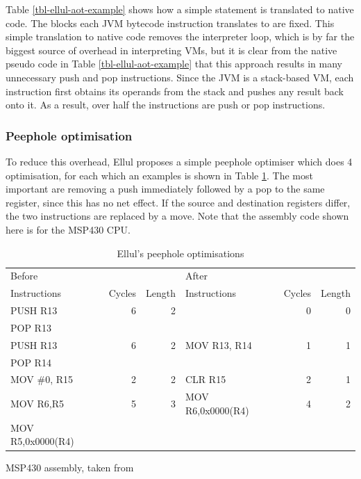 Table \ref{tbl-ellul-aot-example} shows how a simple statement is translated to native code. The blocks each JVM bytecode instruction translates to are fixed. This simple translation to native code removes the interpreter loop, which is by far the biggest source of overhead in interpreting VMs, but it is clear from the native pseudo code in Table \ref{tbl-ellul-aot-example} that this approach results in many unnecessary push and pop instructions. Since the JVM is a stack-based VM, each instruction first obtains its operands from the stack and pushes any result back onto it. As a result, over half the instructions are push or pop instructions.

\subsubsection{Peephole optimisation}
To reduce this overhead, Ellul proposes a simple peephole optimiser \cite{Ellul:2012thesis} which does 4 optimisation, for each which an examples is shown in Table \ref{tbl-ellul-peephole}. The most important are removing a push immediately followed by a pop to the same register, since this has no net effect. If the source and destination registers differ, the two instructions are replaced by a move. Note that the assembly code shown here is for the MSP430 CPU.

\begin{table}[]
\centering
\caption{Ellul's peephole optimisations}
\label{tbl-ellul-peephole}
\begin{threeparttable}
\begin{tabular}{lrrlrr}
\toprule
Before &  &  & After &  & \\
Instructions      & Cycles & Length & Instructions      & Cycles & Length \\
\midrule
\midrule
PUSH R13          & 6      & 2      &                   & 0      & 0 \\
POP R13           &        &        &                   &        & \\
\midrule
PUSH R13          & 6      & 2      & MOV R13, R14      & 1      & 1 \\
POP R14           &        &        &                   &        & \\
\midrule
MOV \#0, R15      & 2      & 2      & CLR R15           & 2      & 1 \\
\midrule
MOV R6,R5         & 5      & 3      & MOV R6,0x0000(R4) & 4      & 2 \\
MOV R5,0x0000(R4) &        &        &                   &        & \\
\bottomrule
\end{tabular}
\begin{tablenotes}
\item MSP430 assembly, taken from \cite{Ellul:2012thesis}
\end{tablenotes}
\end{threeparttable}
\end{table}

